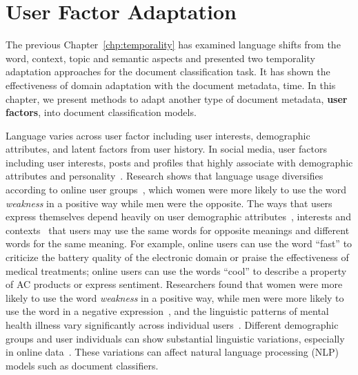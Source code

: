 \chapter{User Factor Adaptation}
\label{chp:user}

The previous Chapter~\ref{chp:temporality} has examined language shifts from the word, context, topic and semantic aspects and presented two temporality adaptation approaches for the document classification task. 
It has shown the effectiveness of domain adaptation with the document metadata, time.
In this chapter, we present methods to adapt another type of document metadata, \textbf{user factors}, into document classification models. 

Language varies across user factor including user interests, demographic attributes, and latent factors from user history.
In social media, user factors including user interests, posts and profiles that highly associate with demographic attributes and personality~\cite{lynn2017human}.
Research shows that language usage diversifies according to online user groups~\cite{volkova2013exploring}, which women were more likely to use the word \textit{weakness} in a positive way while men were the opposite.
The ways that users express themselves depend heavily on user demographic attributes~\cite{hovy2018improving}, interests and contexts~\cite{oba2019modeling} that users may use the same words for opposite meanings and different words for the same meaning.
For example, online users can use the word ``fast'' to criticize the battery quality of the electronic domain or praise the effectiveness of medical treatments; online users can use the words ``cool'' to describe a property of AC products or express sentiment.
Researchers found that women were more likely to use the word \textit{weakness} in a positive way, while men were more likely to use the word in a negative expression~\cite{volkova2013exploring}, and the linguistic patterns of mental health illness vary significantly across individual users~\cite{amir2017quantifying}.
Different demographic groups and user individuals can show substantial linguistic variations, especially in online data~\cite{johannsen2015cross, goel2016social, pan2019social}. 
These variations can affect natural language processing (NLP) models such as document classifiers.

